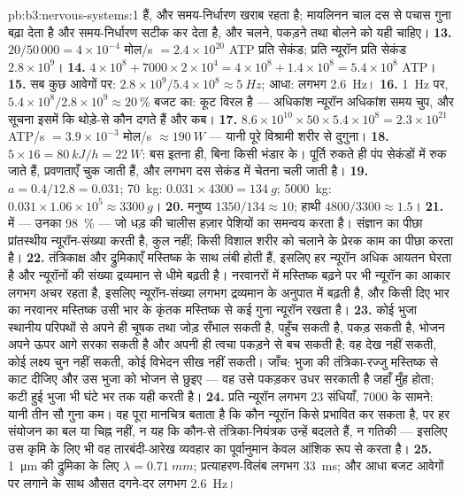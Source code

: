 \begin{solution}{pb:b3:nervous-systems:1}
हैं, और समय-निर्धारण खराब रहता है; मायलिनन चाल दस से पचास गुना बढ़ा
देता है और समय-निर्धारण सटीक कर देता है, और चलने, पकड़ने तथा बोलने को
यही चाहिए।
\textbf{13.} $20/50\,000 = 4\times 10^{-4}$ मोल/s $= 2.4\times 10^{20}$
ATP प्रति सेकंड; प्रति न्यूरॉन प्रति सेकंड $2.8\times 10^{9}$।
\textbf{14.} $4\times 10^{8} + 7000\times 2\times 10^{4} = 4\times 10^{8}
+ 1.4\times 10^{8} = 5.4\times 10^{8}$ ATP।
\textbf{15.} सब कुछ आवेगों पर: $2.8\times 10^{9}/5.4\times 10^{8} \approx
\qty{5}{Hz}$; आधा: लगभग \qty{2.6}{Hz}।
\textbf{16.} \qty{1}{Hz} पर, $5.4\times 10^{8}/2.8\times 10^{9} \approx
\qty{20}{\%}$ बजट का: कूट विरल है --- अधिकांश न्यूरॉन अधिकांश समय चुप,
और सूचना इसमें कि थोड़े-से कौन दगते हैं और कब।
\textbf{17.} $8.6\times 10^{10}\times 50\times 5.4\times 10^{8} = 2.3
\times 10^{21}$ ATP/s $= 3.9\times 10^{-3}$ मोल/s $\approx \qty{190}{W}$
--- यानी पूरे विश्रामी शरीर से दुगुना।
\textbf{18.} $5\times 16 = \qty{80}{kJ/h} = \qty{22}{W}$: बस इतना ही,
बिना किसी भंडार के। पूर्ति रुकते ही पंप सेकंडों में रुक जाते हैं,
प्रवणताएँ चुक जाती हैं, और लगभग दस सेकंड में चेतना चली जाती है।
\textbf{19.} $a = 0.4/12.8 = 0.031$; \qty{70}{kg}: $0.031\times 4300 =
\qty{134}{g}$; \qty{5000}{kg}: $0.031\times 1.06\times 10^{5} \approx
\qty{3300}{g}$।
\textbf{20.} मनुष्य $1350/134 \approx 10$; हाथी $4800/3300 \approx
1.5$।
\textbf{21.}  में --- उनका \qty{98}{\%} --- जो धड़ की चालीस
हज़ार पेशियों का समन्वय करता है। संज्ञान का पीछा प्रांतस्थीय
न्यूरॉन-संख्या करती है, कुल नहीं;  किसी विशाल शरीर को चलाने
के प्रेरक काम का पीछा करता है।
\textbf{22.} तंत्रिकाक्ष और द्रुमिकाएँ मस्तिष्क के साथ लंबी होती हैं,
इसलिए हर न्यूरॉन अधिक आयतन घेरता है और न्यूरॉनों की संख्या द्रव्यमान से
धीमे बढ़ती है। नरवानरों में मस्तिष्क बढ़ने पर भी न्यूरॉन का आकार लगभग
अचर रहता है, इसलिए न्यूरॉन-संख्या लगभग द्रव्यमान के अनुपात में बढ़ती
है, और किसी दिए भार का नरवानर मस्तिष्क उसी भार के कृंतक मस्तिष्क से कई
गुना न्यूरॉन रखता है।
\textbf{23.} कोई भुजा स्थानीय परिपथों से अपने ही चूषक तथा जोड़ सँभाल
सकती है, पहुँच सकती है, पकड़ सकती है, भोजन अपने ऊपर आगे सरका सकती है
और अपनी ही त्वचा पकड़ने से बच सकती है; वह देख नहीं सकती, कोई लक्ष्य
चुन नहीं सकती, कोई विभेदन सीख नहीं सकती। जाँच: भुजा की तंत्रिका-रज्जु
मस्तिष्क से काट दीजिए और उस भुजा को भोजन से छुइए --- वह उसे पकड़कर
उधर सरकाती है जहाँ मुँह होता; कटी हुई भुजा भी घंटे भर तक यही करती है।
\textbf{24.} प्रति न्यूरॉन लगभग $23$ संधियाँ, $7000$ के सामने: यानी तीन
सौ गुना कम। वह पूरा मानचित्र बताता है कि कौन न्यूरॉन किसे प्रभावित कर
सकता है, पर हर संयोजन का बल या चिह्न नहीं, न यह कि कौन-से तंत्रिका-नियंत्रक
उन्हें बदलते हैं, न गतिकी --- इसलिए उस कृमि के लिए भी वह तारबंदी-आरेख
व्यवहार का पूर्वानुमान केवल आंशिक रूप से करता है।
\textbf{25.} \qty{1}{\micro m} की द्रुमिका के लिए $\lambda = \qty{0.71}{mm}$;
प्रत्याहरण-विलंब लगभग \qty{33}{ms}; और आधा बजट आवेगों पर लगाने के साथ
औसत दगने-दर लगभग \qty{2.6}{Hz}।
\end{solution}
